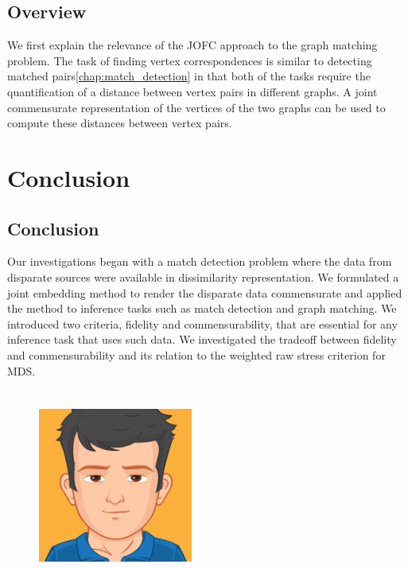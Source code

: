 \documentclass[12pt,oneside,final]{thesis}\usepackage[]{graphicx}\usepackage[]{color}
\begin{document}
\section{Overview}
We first explain the relevance of the JOFC approach to the graph matching problem. The task of finding vertex correspondences is similar to  detecting matched pairs\ref{chap:match_detection} in that both of the tasks require the quantification of a distance between vertex pairs in different graphs. A joint commensurate representation of the vertices of the two graphs  can be used to compute these distances between vertex pairs.


\chapter{Conclusion}
\label{sec:conclusion}

\section{Conclusion}

Our investigations began with a match detection problem where the data from disparate sources were available in dissimilarity representation. We formulated a joint embedding method to render the disparate data commensurate and applied the method to inference tasks such as match detection and graph matching. We introduced two criteria, fidelity and commensurability, that are essential for any inference task that uses such data. We investigated the tradeoff between fidelity and commensurability and its relation to the weighted raw stress criterion for MDS.








% 
 \begin{vita}
% 
 \begin{figure}
 \includegraphics[width=2in,height=2.5in,clip,keepaspectratio]{sancarheadshot}
 \end{figure}


 
 \end{vita}
\end{document}
